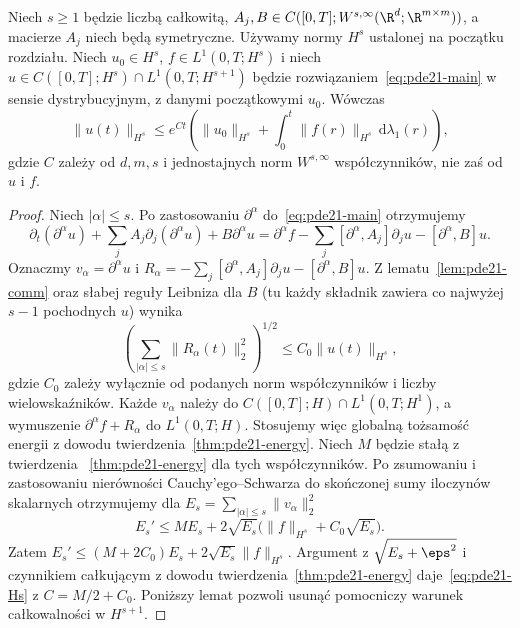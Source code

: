 \begin{twierdzenie}[Energia w $H^s$]\label{thm:pde21-Hs}
Niech $s\ge1$ będzie liczbą całkowitą,
$A_j,B\in C([0,T];W^{s,\infty}(\R^d;\R^{m\times m}))$,
a macierze $A_j$ niech będą symetryczne.
Używamy normy $H^s$ ustalonej na początku rozdziału.
Niech $u_0\in H^s$, $f\in L^1(0,T;H^s)$
i niech $u\in C([0,T];H^s)\cap L^1(0,T;H^{s+1})$
będzie rozwiązaniem~\eqref{eq:pde21-main} w sensie
dystrybucyjnym, z danymi początkowymi $u_0$.
Wówczas
\begin{equation}\label{eq:pde21-Hs}
 \|u(t)\|_{H^s}\le e^{Ct}
 \left(\|u_0\|_{H^s}+\int_0^t\|f(r)\|_{H^s}\,\mathrm d\lambda_1(r)\right),
\end{equation}
gdzie $C$ zależy od $d,m,s$ i jednostajnych norm
$W^{s,\infty}$ współczynników, nie zaś od $u$ i $f$.
\end{twierdzenie}
\begin{proof}
Niech $|\alpha|\le s$. Po zastosowaniu $\partial^\alpha$
do~\eqref{eq:pde21-main} otrzymujemy
\[
 \partial_t(\partial^\alpha u)+\sum_jA_j\partial_j(\partial^\alpha u)
 +B\partial^\alpha u
 =\partial^\alpha f-\sum_j[\partial^\alpha,A_j]\partial_ju
 -[\partial^\alpha,B]u.
\]
Oznaczmy $v_\alpha=\partial^\alpha u$ i
$R_\alpha=-\sum_j[\partial^\alpha,A_j]\partial_ju
-[\partial^\alpha,B]u$.
Z lematu~\ref{lem:pde21-comm} oraz słabej reguły
Leibniza dla $B$ (tu każdy składnik zawiera co
najwyżej $s-1$ pochodnych $u$) wynika
\[
 \left(\sum_{|\alpha|\le s}\|R_\alpha(t)\|_2^2\right)^{1/2}
 \le C_0\|u(t)\|_{H^s},
\]
gdzie $C_0$ zależy wyłącznie od podanych norm
współczynników i liczby wielowskaźników.
Każde $v_\alpha$ należy do $C([0,T];H)\cap L^1(0,T;H^1)$,
a wymuszenie $\partial^\alpha f+R_\alpha$ do
$L^1(0,T;H)$. Stosujemy więc globalną tożsamość
energii z dowodu twierdzenia~\ref{thm:pde21-energy}.
Niech $M$ będzie stałą z twierdzenia
~\ref{thm:pde21-energy} dla tych współczynników.
Po zsumowaniu i zastosowaniu nierówności
Cauchy'ego--Schwarza do skończonej sumy iloczynów
skalarnych otrzymujemy dla
$E_s=\sum_{|\alpha|\le s}\|v_\alpha\|_2^2$
\[
 E_s'\le M E_s+2\sqrt{E_s}
   \bigl(\|f\|_{H^s}+C_0\sqrt{E_s}\bigr).
\]
Zatem $E_s'\le(M+2C_0)E_s+2\sqrt{E_s}\|f\|_{H^s}$.
Argument z $\sqrt{E_s+\eps^2}$ i czynnikiem całkującym
z dowodu twierdzenia~\ref{thm:pde21-energy}
daje~\eqref{eq:pde21-Hs} z $C=M/2+C_0$.
Poniższy lemat pozwoli usunąć pomocniczy warunek
całkowalności w $H^{s+1}$.
\end{proof}


